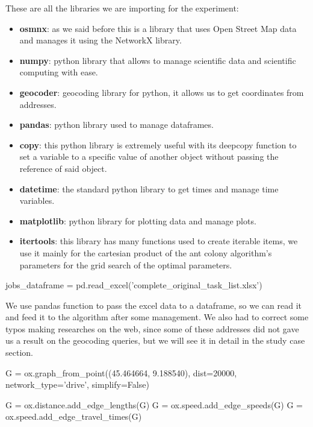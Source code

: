 \documentclass[titlepage]{article}
\begin{document}
These are all the libraries we are importing for the experiment:
\begin{itemize}
    \item \textbf{osmnx}: as we said before this is a library that uses Open Street Map data and manages it using the NetworkX library.
    \item \textbf{numpy}: python library that allows to manage scientific data and scientific computing with ease.
    \item \textbf{geocoder}: geocoding library for python, it allows us to get coordinates from addresses.
    \item \textbf{pandas}: python library used to manage dataframes.
    \item \textbf{copy}: this python library is extremely useful with its deepcopy function to set a variable to a specific value of another object without passing the reference of said object.
    \item \textbf{datetime}: the standard python library to get times and manage time variables.
    \item \textbf{matplotlib}: python library for plotting data and manage plots.
    \item \textbf{itertools}: this library has many functions used to create iterable items, we use it mainly for the cartesian product of the ant colony algorithm's parameters for the grid search of the optimal parameters.
\end{itemize}

\begin{python}
jobs_dataframe = pd.read_excel('complete_original_task_list.xlsx')
\end{python}

We use pandas function to pass the excel data to a dataframe, so we can read it and feed it to the algorithm after some management. We also had to correct some typos making researches on the web, since some of these addresses did not gave us a result on the geocoding queries, but we will see it in detail in the study case section.

\begin{python}
G = ox.graph_from_point((45.464664, 9.188540), dist=20000, network_type='drive', simplify=False)

G = ox.distance.add_edge_lengths(G)
G = ox.speed.add_edge_speeds(G)
G = ox.speed.add_edge_travel_times(G)
\end{python}
\end{document}

